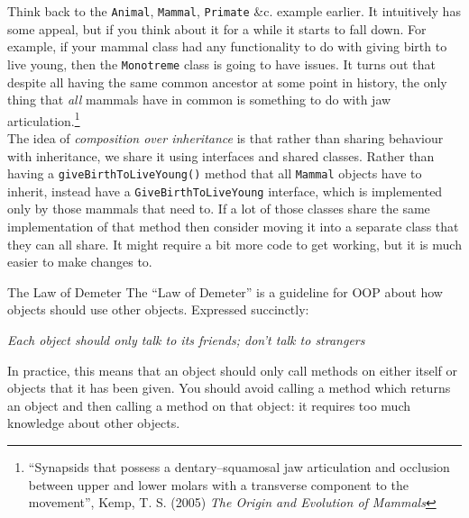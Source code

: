 
Think back to the \texttt{Animal}, \texttt{Mammal}, \texttt{Primate} \&c. example earlier. It intuitively has some appeal, but if you think about it for a while it starts to fall down. For example, if your mammal class had any functionality to do with giving birth to live young, then the \texttt{Monotreme} class is going to have issues. It turns out that despite all having the same common ancestor at some point in history, the only thing that \textit{all} mammals have in common is something to do with jaw articulation.\footnote{``Synapsids that possess a dentary–squamosal jaw articulation and occlusion between upper and lower molars with a transverse component to the movement'', Kemp, T. S. (2005) \textit{The Origin and Evolution of Mammals}}
\\

The idea of \textit{composition over inheritance} is that rather than sharing behaviour with inheritance, we share it using interfaces and shared classes. Rather than having a \texttt{giveBirthToLiveYoung()} method that all \texttt{Mammal} objects have to inherit, instead have a \texttt{GiveBirthToLiveYoung} interface, which is implemented only by those mammals that need to. If a lot of those classes share the same implementation of that method then consider moving it into a separate class that they can all share. It might require a bit more code to get working, but it is much easier to make changes to.

\pagebreak

\begin{infobox}{The Law of Demeter}
    The ``Law of Demeter'' is a guideline for OOP about how objects should use other objects. Expressed succinctly:

    \begin{center}
        \textit{Each object should only talk to its friends; don't talk to strangers}
    \end{center}

    In practice, this means that an object should only call methods on either itself or objects that it has been given. You should avoid calling a method which returns an object and then calling a method on that object: it requires too much knowledge about other objects.

\end{infobox}

